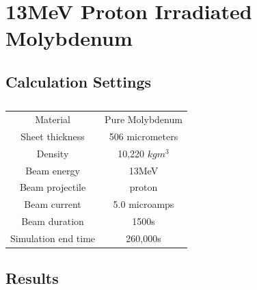 \FloatBarrier
\clearpage
\section{13MeV Proton Irradiated Molybdenum}
\label{appendix:johnmo}

\FloatBarrier
\subsection{Calculation Settings}

\begin{table}[h]
\begin{center}
\begin{tabular}{c c}
\hline\hline
Material & Pure Molybdenum \\
Sheet thickness & 506 micrometers \\
Density & 10,220 $kg m^{3}$ \\
Beam energy & 13MeV \\
Beam projectile & proton \\
Beam current & 5.0 microamps \\
Beam duration & 1500s \\
Simulation end time & 260,000s \\
\hline\hline
\end{tabular}
\end{center}
\caption{}
\label{table:appendixironsettings}
\end{table}

\FloatBarrier
\subsection{Results}

